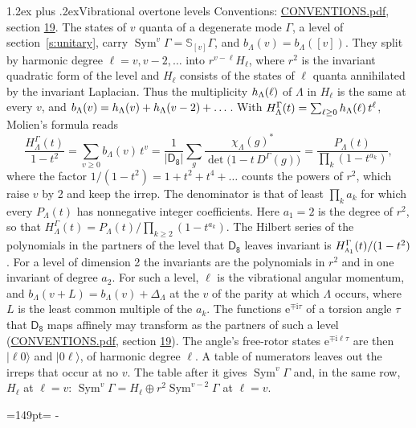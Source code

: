 \documentclass[10pt,a4paper]{article}
\makeatletter
\renewcommand\section{\@startsection{section}{1}{\z@}{-3ex plus -1ex minus -.2ex}%
  {1.2ex plus .2ex}{\normalfont\large\sffamily\bfseries\color{parttitle}}}
\newcommand{\needspace}[1]{\par\penalty-100\begingroup\dimen0=#1\relax\dimen2=\pagegoal
  \advance\dimen2-\pagetotal\ifdim\dimen0>\dimen2\relax\ifdim\dimen2>0pt\vfil\break\fi\fi
  \endgroup}
\numberwithin{equation}{section}
\newcommand{\grp}[1]{\mathsf{#1}}
\newcommand{\irr}[1]{\text{\normalfont\scshape #1}}
\newcommand{\iunit}{\mathrm{i}}
\newcommand{\expe}{\mathrm{e}}
\newcommand{\repD}[1]{D^{#1}}
\newcommand{\irchar}[1]{\chi_{#1}}
\newcommand{\conj}[1]{{#1}^{*}}
\newcommand{\schur}[1]{\mathbb{S}_{#1}}
\newcommand{\shape}[1]{[#1]}
\newcommand{\occ}[1]{\lvert #1\rangle}
\makeatother
\begin{document}
\section{Vibrational overtone levels}\label{s:overtones}
Conventions: \href{../../CONVENTIONS.pdf}{CONVENTIONS.pdf}, section \href{../../CONVENTIONS.pdf\#conv.19}{19}.
\leavevmode\label{n:index.quanta}\label{n:operator.symmetric.power}The states of $v$ quanta of a degenerate mode $\Gamma$, a level of section~\ref{s:unitary}, carry $\operatorname{Sym}^{v}\Gamma = \schur{\shape{v}}\Gamma$, and $b_\Lambda(v) = b_\Lambda(\shape{v})$. \label{n:local.quadratic.form}\label{n:set.harmonic}They split by harmonic degree $\ell = v, v - 2, \dots$ into $r^{v-\ell}H_\ell$, where $r^2$ is the invariant quadratic form of the level and $H_\ell$ consists of the states of $\ell$ quanta annihilated by the invariant Laplacian. \label{n:function.multiplicity.harmonic}Thus the multiplicity $\mathnormal{h}_\Lambda(\ell)$ of $\Lambda$ in $H_\ell$ is the same at every $v$, and $b_\Lambda(v) = \mathnormal{h}_\Lambda(v) + \mathnormal{h}_\Lambda(v - 2) + \dots$. \label{n:function.generating.level}With $H^{\Gamma}_\Lambda(t) = \sum_{\ell\ge0} \mathnormal{h}_\Lambda(\ell)\,t^{\ell}$, Molien's formula reads
\begin{equation}\label{e:molien}\frac{H^{\Gamma}_\Lambda(t)}{1 - t^2} = \sum_{v\ge0} b_\Lambda(v)\,t^v = \frac{1}{|\grp{D_{8}}|}\sum_{g}\frac{\conj{\irchar{\Lambda}(g)}}{\det\bigl(1 - t\,\repD{\Gamma}(g)\bigr)} = \frac{P_\Lambda(t)}{\prod_k (1-t^{a_k})},\end{equation}
where the factor $1/(1 - t^2) = 1 + t^2 + t^4 + \dots$ counts the powers of $r^2$, which raise $v$ by 2 and keep the irrep. The denominator is that of least $\prod_k a_k$ for which every $P_\Lambda(t)$ has nonnegative integer coefficients. Here $a_1 = 2$ is the degree of $r^2$, so that $H^{\Gamma}_\Lambda(t) = P_\Lambda(t)/\prod_{k\ge2}(1 - t^{a_k})$. The Hilbert series of the polynomials in the partners of the level that $\grp{D_{8}}$ leaves invariant is $H^{\Gamma}_{\irr{a}_{1}}(t)/(1 - t^2)$. For a level of dimension 2 the invariants are the polynomials in $r^2$ and in one invariant of degree $a_2$. \label{n:index.overtone.period}\label{n:index.increment.unitary}For such a level, $\ell$ is the vibrational angular momentum, and $b_\Lambda(v + L) = b_\Lambda(v) + \Delta_\Lambda$ at the $v$ of the parity at which $\Lambda$ occurs, where $L$ is the least common multiple of the $a_k$. \label{n:local.torsion.angle}The functions $\expe^{\mp\iunit\tau}$ of a torsion angle $\tau$ that $\grp{D_{8}}$ maps affinely may transform as the partners of such a level (\href{../../CONVENTIONS.pdf}{CONVENTIONS.pdf}, section \href{../../CONVENTIONS.pdf\#conv.19}{19}). The angle's free-rotor states $\expe^{\mp\iunit\ell\tau}$ are then $\occ{\ell 0}$ and $\occ{0 \ell}$, of harmonic degree $\ell$. A table of numerators leaves out the irreps that occur at no $v$. The table after it gives $\operatorname{Sym}^{v}\Gamma$ and, in the same row, $H_\ell$ at $\ell = v$: $\operatorname{Sym}^{v}\Gamma = H_\ell \oplus r^2\operatorname{Sym}^{v-2}\Gamma$ at $\ell = v$.
\needspace{149pt}
\end{document}
